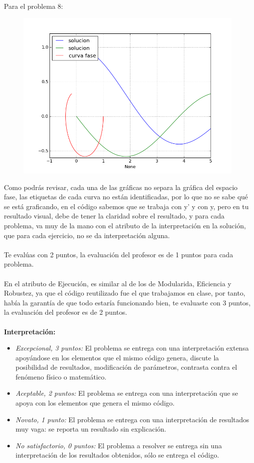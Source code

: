 \documentclass[letterpaper]{article}
\begin{document}
Para el problema 8:
\begin{figure}[H]
	\centering
	\includegraphics[scale=0.5]{Problema8_Ricardo.png} 
\end{figure}
Como podrás revisar, cada una de las gráficas no separa la gráfica del espacio fase, las etiquetas de cada curva no están identificadas, por lo que no se sabe qué se está graficando, en el código sabemos que se trabaja con y' y con y, pero en tu resultado visual, debe de tener la claridad sobre el resultado, y para cada problema, va muy de la mano con el atributo de la interpretación en la solución, que para cada ejercicio, no se da interpretación alguna.
\\
\\
Te evalúas con 2 puntos, la evaluación del profesor es de 1 puntos para cada problema.
\\
\\
En el atributo de Ejecución, es similar al de los de Modularida, Eficiencia y Robustez, ya que el código reutilizado fue el que trabajamos en clase, por tanto, había la garantía de que todo estaría funcionando bien, te evaluaste con 3 puntos, la evaluación del profesor es de 2 puntos.
\\
\\
\textbf{Interpretación:}
\begin{itemize}
\item \emph{Excepcional, 3 puntos:} El problema se entrega con una interpretación extensa apoyándose en los elementos que el mismo código genera, discute la posibilidad de resultados, modificación de parámetros, contrasta contra el fenómeno físico o matemático.
\item \emph{Aceptable, 2 puntos:} El problema se entrega con una interpretación que se apoya con los elementos que genera el mismo código.
\item \emph{Novato, 1 punto:} El problema se entrega con una interpretación de  resultados muy vaga: se reporta un resultado sin explicación.
\item \emph{No satisfactorio, 0 puntos:} El problema a resolver se entrega sin una interpretación de los resultados obtenidos, sólo se entrega el código.
\end{itemize}
\end{document}

